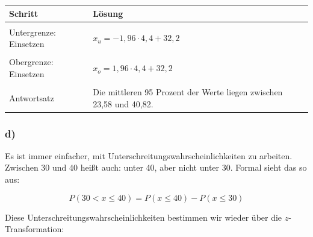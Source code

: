 \documentclass[
  11pt,
  ngerman,
  a4paper,
]{report}
\begin{document}
\begin{table}[H]
\centering
\begin{tabular}{>{\raggedright\arraybackslash}p{8cm}>{\raggedright\arraybackslash}p{8cm}}
\toprule
\textbf{Schritt} & \textbf{Lösung}\\
\midrule
\cellcolor{gray!6}{Formel} & \cellcolor{gray!6}{$x_{i} = z_{i} \cdot \sigma + \mu$}\\
Untergrenze: Einsetzen & $x_{u} = -1{,}96 \cdot 4{,}4 + 32{,}2$\\
\cellcolor{gray!6}{Untergrenze: Ergebnis} & \cellcolor{gray!6}{$x_{u}\approx23{,}58$}\\
Obergrenze: Einsetzen & $x_{o} = 1{,}96 \cdot 4{,}4 + 32{,}2$\\
\cellcolor{gray!6}{Obergrenze: Ergebnis} & \cellcolor{gray!6}{$x_{o}\approx40{,}82$}\\
Antwortsatz & Die mittleren 95 Prozent der Werte liegen zwischen 23,58 und 40,82.\\
\bottomrule
\end{tabular}
\end{table}

\hypertarget{d-2}{%
\subsubsection{d)}\label{d-2}}

Es ist immer einfacher, mit Unterschreitungs­wahrscheinlichkeiten zu arbeiten. Zwischen 30 und 40 heißt auch: unter 40, aber nicht unter 30. Formal sieht das so aus:

\[P(30 < x \leq 40) = P(x \leq 40) - P(x \leq 30)\]

Diese Unterschreitungs­wahrscheinlichkeiten bestimmen wir wieder über die \(z\)-Transformation:
\end{document}
